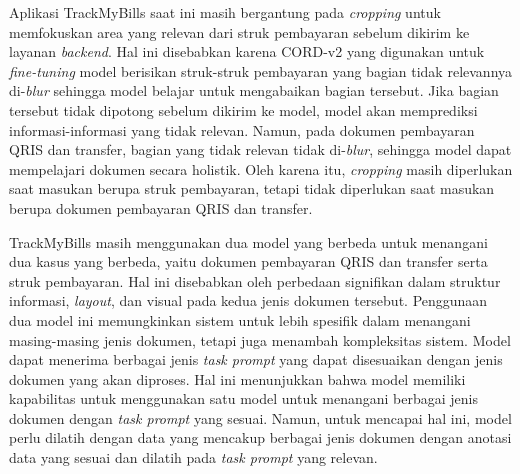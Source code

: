Aplikasi TrackMyBills saat ini masih bergantung pada \emph{cropping} untuk memfokuskan area yang relevan dari struk pembayaran sebelum dikirim ke layanan \emph{backend}. Hal ini disebabkan karena \dataset{} CORD-v2 yang digunakan untuk \emph{fine-tuning} model \donut{} berisikan struk-struk pembayaran yang bagian tidak relevannya di-\emph{blur} sehingga model belajar untuk mengabaikan bagian tersebut. Jika bagian tersebut tidak dipotong sebelum dikirim ke model, model akan memprediksi informasi-informasi yang tidak relevan. Namun, pada dokumen pembayaran QRIS dan transfer, bagian yang tidak relevan tidak di-\emph{blur}, sehingga model \donut{} dapat mempelajari dokumen secara holistik. Oleh karena itu, \emph{cropping} masih diperlukan saat masukan berupa struk pembayaran, tetapi tidak diperlukan saat masukan berupa dokumen pembayaran QRIS dan transfer.

TrackMyBills masih menggunakan dua model yang berbeda untuk menangani dua kasus yang berbeda, yaitu dokumen pembayaran QRIS dan transfer serta struk pembayaran. Hal ini disebabkan oleh perbedaan signifikan dalam struktur informasi, \emph{layout}, dan visual pada kedua jenis dokumen tersebut. Penggunaan dua model ini memungkinkan sistem untuk lebih spesifik dalam menangani masing-masing jenis dokumen, tetapi juga menambah kompleksitas sistem. Model \donut{} dapat menerima berbagai jenis \emph{task prompt} yang dapat disesuaikan dengan jenis dokumen yang akan diproses. Hal ini menunjukkan bahwa model \donut{} memiliki kapabilitas untuk menggunakan satu model untuk menangani berbagai jenis dokumen dengan \emph{task prompt} yang sesuai. Namun, untuk mencapai hal ini, model perlu dilatih dengan data yang mencakup berbagai jenis dokumen dengan anotasi data yang sesuai dan dilatih pada \emph{task prompt} yang relevan.